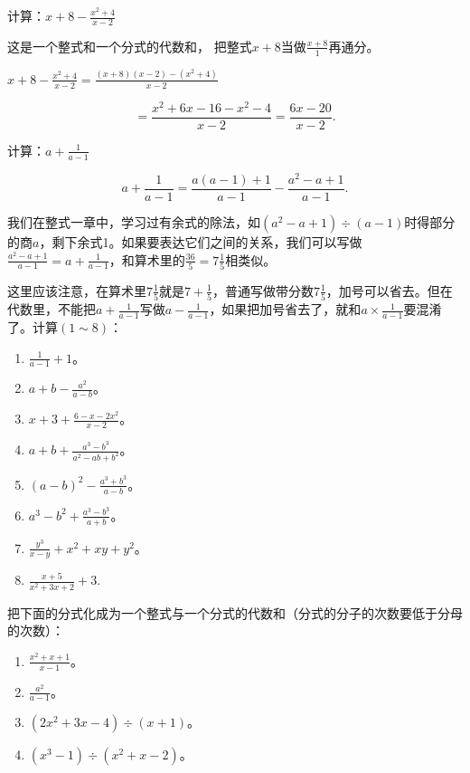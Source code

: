  计算：\(x + 8 - \frac{x^2 + 4}{x - 2}\)

 这是一个整式和一个分式的代数和，
把整式\(x + 8\)当做\(\frac{x + 8}{1}\)再通分。

\(x + 8 - \frac{x^2 + 4}{x - 2} = \frac{(x + 8)(x - 2) - (x^2 + 4)}{x - 2}\)

\[
= \frac{x ^{2} + 6 x - 16 - x ^{2} - 4}{x - 2} = \frac{6 x - 20}{x - 2}.
\]

 计算：\(a + \frac{1}{a - 1}\)


\[
a + \frac{1}{a - 1} = \frac{a (a - 1) + 1}{a - 1} - \frac{a ^{2} - a + 1}{a - 1}.
\]


我们在整式一章中，学习过有余式的除法，如\((a^2 - a + 1) \div (a - 1)\)时得部分的商\(a\)，剩下余式1。如果要表达它们之间的关系，我们可以写做\(\frac{a^2 - a + 1}{a - 1} = a + \frac{1}{a - 1}\)，和算术里的\(\frac{36}{5} = 7\frac{1}{5}\)相类似。

这里应该注意，在算术里\(7\frac{1}{5}\)就是\(7 + \frac{1}{5}\)，普通写做带分数\(7\frac{1}{5}\)，加号可以省去。但在代数里，不能把\(a + \frac{1}{a - 1}\)写做\(a - \frac{1}{a - 1}\)，如果把加号省去了，就和\(a \times \frac{1}{a - 1}\)要混淆了。计算\((1 \sim 8)\)：

\begin{enumerate}[start=1]
\item
  \(\frac{1}{a - 1} + 1\)。
\item
  \(a + b - \frac{a^2}{a - b}\)。
\item
  \(x + 3 + \frac{6 - x - 2x^2}{x - 2}\)。
\item
  \(a + b + \frac{a^3 - b^3}{a^2 - ab + b^2}\)。
\item
  \((a - b)^2 - \frac{a^3 + b^3}{a - b}\)。
\item
  \(a^3 - b^2 + \frac{a^3 - b^3}{a + b}\)。
\item
  \(\frac{y^3}{x - y} + x^2 + xy + y^2\)。
\item
  \(\frac{x + 5}{x^2 + 3x + 2} + 3.\)
\end{enumerate}

把下面的分式化成为一个整式与一个分式的代数和（分式的分子的次数要低于分母的次数）：

\begin{enumerate}[start=9]
\item
  \(\frac{x^2 + x + 1}{x - 1}\)。
\item
  \(\frac{a^2}{a - 1}\)。
\item
  \((2x^{2} + 3x - 4) \div (x + 1)\)。
\item
  \((x^{3} - 1) \div (x^{2} + x - 2)\)。
\end{enumerate}

